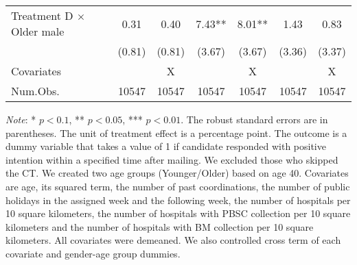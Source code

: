 \documentclass[12pt, a4paper]{article}
\begin{document}
\begin{table}[H]
\begin{threeparttable}
\begin{tabular}[t]{lcccccc}
Treatment D $\times$ Older male & \num{0.31} & \num{0.40} & \num{7.43}** & \num{8.01}** & \num{1.43} & \num{0.83}\\
 & (\num{0.81}) & (\num{0.81}) & (\num{3.67}) & (\num{3.67}) & (\num{3.36}) & (\num{3.37})\\
\midrule
Covariates &  & X &  & X &  & X\\
Num.Obs. & \num{10547} & \num{10547} & \num{10547} & \num{10547} & \num{10547} & \num{10547}\\
\bottomrule
\end{tabular}
\begin{tablenotes}
\item \emph{Note}: * $p < 0.1$, ** $p < 0.05$, *** $p < 0.01$. The robust standard errors are in parentheses. The unit of treatment effect is a percentage point. The outcome is a dummy variable that takes a value of 1 if candidate responded with positive intention within a specified time after mailing. We excluded those who skipped the CT. We created two age groups (Younger/Older) based on age 40. Covariates are age, its squared term, the number of past coordinations, the number of public holidays in the assigned week and the following week, the number of hospitals per 10 square kilometers, the number of hospitals with PBSC collection per 10 square kilometers and the number of hospitals with BM collection per 10 square kilometers. All covariates were demeaned. We also controlled cross term of each covariate and gender-age group dummies.
\end{tablenotes}
\end{threeparttable}
\end{table}
\end{document}
